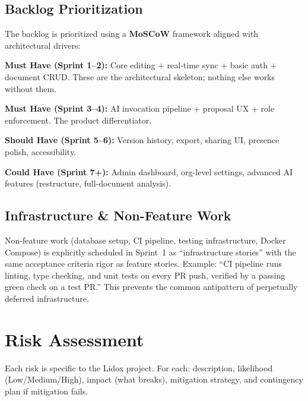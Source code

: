 \documentclass[10pt, a4paper]{article}
\begin{document}
\subsection{Backlog Prioritization}

The backlog is prioritized using a \textbf{MoSCoW} framework aligned with architectural drivers:

\begin{specenum}
\item \textbf{Must Have (Sprint 1--2):} Core editing + real-time sync + basic auth + document CRUD. These are the architectural skeleton; nothing else works without them.
\item \textbf{Must Have (Sprint 3--4):} AI invocation pipeline + proposal UX + role enforcement. The product differentiator.
\item \textbf{Should Have (Sprint 5--6):} Version history, export, sharing UI, presence polish, accessibility.
\item \textbf{Could Have (Sprint 7+):} Admin dashboard, org-level settings, advanced AI features (restructure, full-document analysis).
\end{specenum}

\subsection{Infrastructure \& Non-Feature Work}

Non-feature work (database setup, CI pipeline, testing infrastructure, Docker Compose) is explicitly scheduled in Sprint~1 as ``infrastructure stories'' with the same acceptance criteria rigor as feature stories. Example: ``CI pipeline runs linting, type checking, and unit tests on every PR push, verified by a passing green check on a test PR.'' This prevents the common antipattern of perpetually deferred infrastructure.


\section{Risk Assessment}

\begin{warnbox}
\small Each risk is specific to the Lidox project. For each: description, likelihood (Low/Medium/High), impact (what breaks), mitigation strategy, and contingency plan if mitigation fails.
\end{warnbox}
\end{document}
